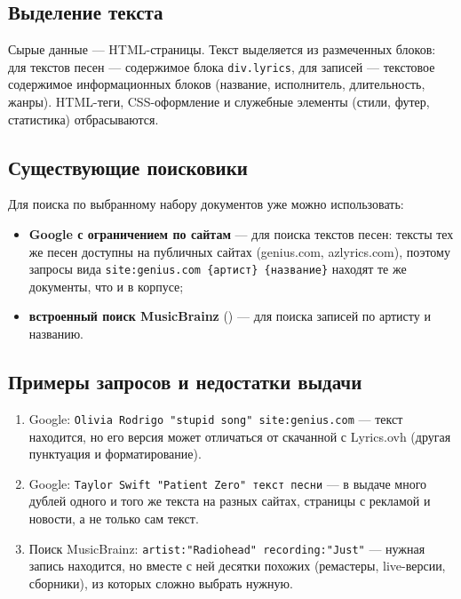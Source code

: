 \subsection{Выделение текста}
Сырые данные --- HTML-страницы. Текст выделяется из размеченных блоков: для
текстов песен --- содержимое блока \texttt{div.lyrics}, для записей --- текстовое
содержимое информационных блоков (название, исполнитель, длительность, жанры).
HTML-теги, CSS-оформление и служебные элементы (стили, футер, статистика)
отбрасываются.

\subsection{Существующие поисковики}
Для поиска по выбранному набору документов уже можно использовать:

\begin{itemize}
    \item \textbf{Google с ограничением по сайтам} --- для поиска текстов песен:
    тексты тех же песен доступны на публичных сайтах (genius.com, azlyrics.com),
    поэтому запросы вида \texttt{site:genius.com \{артист\} \{название\}} находят
    те же документы, что и в корпусе;
    \item \textbf{встроенный поиск MusicBrainz}
    () --- для
    поиска записей по артисту и названию.
\end{itemize}

\subsection{Примеры запросов и недостатки выдачи}

\begin{enumerate}
    \item Google: \texttt{Olivia Rodrigo "stupid song" site:genius.com} --- текст
    находится, но его версия может отличаться от скачанной с Lyrics.ovh (другая
    пунктуация и форматирование).
    \item Google: \texttt{Taylor Swift "Patient Zero" текст песни} --- в выдаче
    много дублей одного и того же текста на разных сайтах, страницы с рекламой и
    новости, а не только сам текст.
    \item Поиск MusicBrainz: \texttt{artist:"Radiohead" recording:"Just"} ---
    нужная запись находится, но вместе с ней десятки похожих (ремастеры,
    live-версии, сборники), из которых сложно выбрать нужную.
\end{enumerate}

